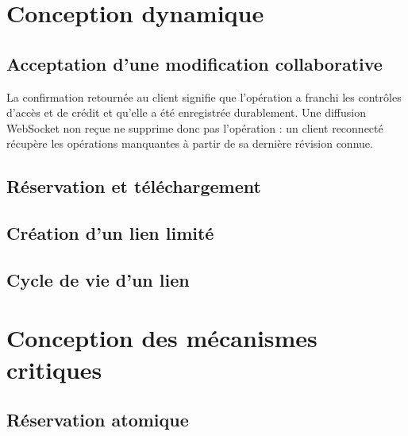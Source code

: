\section{Conception dynamique}
\subsection{Acceptation d'une modification collaborative}


La confirmation retournée au client signifie que l'opération a franchi les contrôles d'accès et de crédit et qu'elle a été enregistrée durablement. Une diffusion WebSocket non reçue ne supprime donc pas l'opération : un client reconnecté récupère les opérations manquantes à partir de sa dernière révision connue.


\subsection{Réservation et téléchargement}


\subsection{Création d'un lien limité}


\subsection{Cycle de vie d'un lien}


\section{Conception des mécanismes critiques}
\subsection{Réservation atomique}

